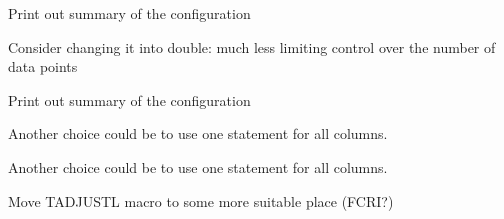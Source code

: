 
\begin{DoxyRefList}
\item[Subprogram \mbox{\hyperlink{namespacedmcasr_a9627e288521e1fc5a2ed322ce87dda30}{dmcasr\+::asrmodule\+\_\+printconfig}} (this, outunit)]\label{todo__todo000001}%
%
Print out summary of the configuration  
\item[Subprogram \mbox{\hyperlink{structdmcewc_1_1ewcmodule_a3fb3572cfea554bcf51a3d345ed22fdf}{dmcewc\+::ewcmodule\+::n\+\_\+intervals}} ]\label{todo__todo000002}%
%
Consider changing it into double\+: much less limiting control over the number of data points  
\item[Subprogram \mbox{\hyperlink{namespacedmcewc_ad2068e783ac6e882c015618e0c14db71}{dmcewc\+::ewcmodule\+\_\+printconfig}} (this, outunit)]\label{todo__todo000003}%
%
Print out summary of the configuration  
\item[Subprogram \mbox{\hyperlink{namespacedmcresultfileoutput_a2714cdcd072692ed4c404696da5eedb2}{dmcresultfileoutput\+::writedata}} (iounit, data, column\+\_\+widths, data\+\_\+formats)]\label{todo__todo000005}%
%
Another choice could be to use one statement for all columns. 

\label{todo__todo000006}%
%
Another choice could be to use one statement for all columns.  
\item[Subprogram \mbox{\hyperlink{namespacedmcresultfileoutput_acd9efadc98ad67a15029255c352f87ba}{dmcresultfileoutput\+::writeresultfile}} (iounit, data, column\+\_\+names, column\+\_\+widths, use\+\_\+column\+\_\+numbers, data\+\_\+formats)]\label{todo__todo000004}%
%
Move TADJUSTL macro to some more suitable place (FCRI?) 
\end{DoxyRefList}